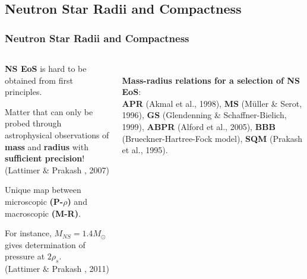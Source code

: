 \subsection*{Neutron Star Radii and Compactness}
\begin{frame}
\frametitle{Neutron Star Radii and Compactness}

\begin{columns}[c]
\begin{column}{0.55\textwidth}

\begin{itemize}
\scriptsize{
\item  {\bf NS EoS} is hard to be obtained from first principles.

\quad
 
 \item Matter that can only be probed through astrophysical observations of {\bf mass} and {\bf radius} with {\bf sufficient precision}!  \\{\tiny (Lattimer $\&$ Prakash , 2007)}
 
 \quad
 
\item Unique map between microscopic {\bf (P-$\rho$)} and macroscopic {\bf(M-R)}.


\quad

\item For instance, $M_{NS}=1.4 M_{\odot}$ gives determination of pressure at $2 \rho_s$.\\ {\tiny (Lattimer $\&$ Prakash , 2011)}
}


\end{itemize}
\end{column}

\begin{column}{0.6\textwidth}
 \\
	{\tiny {\bf Mass-radius relations for a selection of NS EoS}: \\{\bf APR} (Akmal et al., 1998), {\bf MS} (M\"uller \& Serot, 1996), {\bf GS} (Glendenning \& Schaffner-Bielich, 1999), {\bf  ABPR }(Alford et al., 2005),  {\bf BBB} (Brueckner-Hartree-Fock model), {\bf SQM }(Prakash et al., 1995).}
 \end{column}
 \end{columns}
\end{frame}



